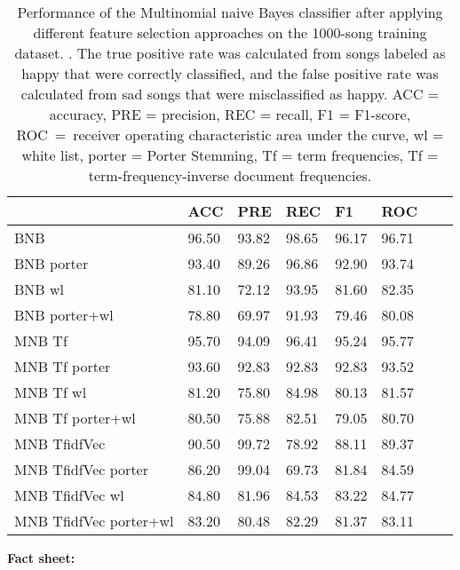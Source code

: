 \documentclass{article}
\begin{document}
\begin{table}[h]
  \caption{Performance of the Multinomial naive Bayes classifier after applying different feature selection approaches on the 1000-song training dataset. . The true positive rate was calculated from songs labeled as happy that were correctly classified, and the false positive rate was calculated from sad songs that were misclassified as happy. ACC = accuracy, PRE = precision, REC = recall, F1 = F1-score, \mbox{ROC = }receiver operating characteristic area under the curve, wl = white list, porter = Porter Stemming, Tf = term frequencies, Tf = term-frequency-inverse document frequencies. }
  
  \begin{tabular}[t]{| l  | l | l | l | l | l | l  |l |}
   \hline
     & ACC  & PRE &  REC & F1& ROC\\
   \hline
   \hline
BNB                     & 96.50    & 93.82    & 98.65    & 96.17   & 96.71        \\
BNB porter             & 93.40    & 89.26    & 96.86    & 92.90   & 93.74        \\
BNB  wl                 & 81.10    & 72.12    & 93.95    & 81.60   & 82.35        \\
BNB porter+wl          & 78.80    & 69.97    & 91.93    & 79.46   & 80.08        \\
MNB Tf           & 95.70    & 94.09    & 96.41    & 95.24   & 95.77        \\
MNB Tf porter    & 93.60    & 92.83    & 92.83    & 92.83   & 93.52        \\
MNB Tf wl        & 81.20    & 75.80    & 84.98    & 80.13   & 81.57        \\
MNB Tf porter+wl & 80.50    & 75.88    & 82.51    & 79.05   & 80.70        \\
MNB TfidfVec           & 90.50    & 99.72    & 78.92    & 88.11   & 89.37        \\
MNB TfidfVec porter    & 86.20    & 99.04    & 69.73    & 81.84   & 84.59        \\
MNB TfidfVec wl        & 84.80    & 81.96    & 84.53    & 83.22   & 84.77        \\
MNB TfidfVec porter+wl & 83.20    & 80.48    & 82.29    & 81.37   & 83.11        \\
   \hline
  \end{tabular}
\end{table}




\textbf{Fact sheet:}
\end{document}

